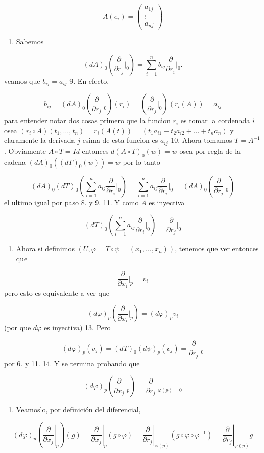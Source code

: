 \begin{bookproof}{}
\[
A(e_i)=\begin{pmatrix} a_{1j} \\  \vdots \\ a_{nj} \end{pmatrix}
\]
\begin{enumerate}[start=8]
\item Sabemos
\end{enumerate}
\[
(dA)_0\left(\frac{\partial}{\partial r_{j}}\bigg|_0\right)=\sum_{i=1}^n b_{ij}\frac{\partial}{\partial r_{i}}\bigg|_0.
\]
veamos que $b_{ij}=a_{ij}$ 9. En efecto,

\[
b_{ij}=(dA)_{0}\left(\frac{\partial}{\partial r_{j}}\bigg|_0\right)(r_{i} )=\left(\frac{\partial}{\partial r_{j}}\bigg|_0\right)(r_{i}(A))=a_{ij}
\]
para entender notar dos cosas primero que la funcion $r_{i}$ es tomar la cordenada $i$ osea $(r_{i}\circ A)(t_{1},\ldots,t_{n})=r_{i}(A(t))=(t_{1}a_{i1}+ t_{2}a_{i2} +\ldots + t_{n}a_{n})$ y claramente la derivada $j$ esima de esta funcion es $a_{ij}$ 10. Ahora tomamos $T=A^{-1}$. Obviamente $A\circ T=Id$ entonces $d(A\circ T)_{0}(w)=w$ osea por regla de la cadena $(dA)_{0}( (dT)_{0}(w))=w$ por lo tanto

\[
(dA)_{0}(dT)_{0}\left(\sum_{i=1}^n a_{ij}\frac{\partial}{\partial r_{i}}\bigg|_0\right)=\sum_{i=1}^n a_{ij}\frac{\partial}{\partial r_{i}}\bigg|_0=(dA)_0\left(\frac{\partial}{\partial r_{j}}\bigg|_0\right)
\]
el ultimo igual por paso 8. y 9. 11. Y como $A$ es inyectiva

\[
(dT)_{0}\left(\sum_{i=1}^n a_{ij}\frac{\partial}{\partial r_{i}}\bigg|_0\right)=\frac{\partial}{\partial r_{j}}\bigg|_0
\]
\begin{enumerate}[start=12]
\item Ahora si definimos $(U,\varphi=T\circ\psi=(x_{1},\ldots,x_{n}))$, tenemos que ver entonces que
\end{enumerate}
\[
\frac{\partial}{\partial x_{i}}\bigg|_{p}=v_{i}
\]
pero esto es equivalente a ver que

\[
(d\varphi)_{p}\left(\frac{\partial}{\partial x_{i}}\bigg|_{p}\right)=(d\varphi)_{p}v_{i}
\]
(por que $d\varphi$ es inyectiva) 13. Pero

\[
(d\varphi)_{p}(v_{j})=(dT)_{0}(d\psi)_{p}(v_{j})=\frac{\partial}{\partial r_{j}}\bigg|_0
\]
por 6. y 11. 14. Y se termina probando que

\[
(d\varphi)_{p}\left(\frac{\partial}{\partial x_{j}}\bigg|_{p}\right)=\frac{\partial}{\partial r_{j}}\bigg|_{\varphi(p)=0}
\]
\begin{enumerate}[start=15]
\item Veamoslo, por definición del diferencial,
\end{enumerate}
\[
(d\varphi)_p\left(\left.\frac{\partial}{\partial x_j}\right|_p\right)(g)=\left.\frac{\partial}{\partial x_j}\right|_p(g\circ\varphi)=\left.\frac{\partial}{\partial r_j}\right|_{\varphi(p)}(g\circ\varphi\circ\varphi^{-1})=\left.\frac{\partial}{\partial r_j}\right|_{\varphi(p)}g
\]
\bookqed
\end{bookproof}
